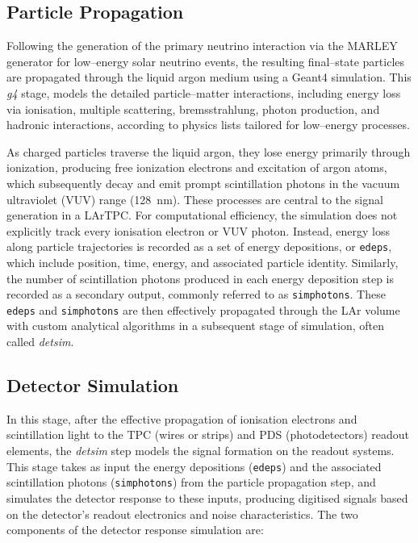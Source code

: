 \subsection{Particle Propagation}
Following the generation of the primary neutrino interaction via the \ac{MARLEY} generator for low--energy solar neutrino events, the resulting final--state particles are propagated through the liquid argon medium using a Geant4 simulation. This \emph{g4} stage, models the detailed particle--matter interactions, including energy loss via ionisation, multiple scattering, bremsstrahlung, photon production, and hadronic interactions, according to physics lists tailored for low--energy processes.

As charged particles traverse the liquid argon, they lose energy primarily through ionization, producing free ionization electrons and excitation of argon atoms, which subsequently decay and emit prompt scintillation photons in the vacuum ultraviolet (VUV) range (\SI{128}{\nano\meter}). These processes are central to the signal generation in a \ac{LArTPC}. For computational efficiency, the simulation does not explicitly track every ionisation electron or VUV photon. Instead, energy loss along particle trajectories is recorded as a set of energy depositions, or \texttt{edeps}, which include position, time, energy, and associated particle identity. Similarly, the number of scintillation photons produced in each energy deposition step is recorded as a secondary output, commonly referred to as \texttt{simphotons}. These \texttt{edeps} and \texttt{simphotons} are then effectively propagated through the \ac{LAr} volume with custom analytical algorithms in a subsequent stage of simulation, often called \emph{detsim}.

\subsection{Detector Simulation}
In this stage, after the effective propagation of ionisation electrons and scintillation light to the TPC (wires or strips) and PDS (photodetectors) readout elements, the \emph{detsim} step models the signal formation on the readout systems. This stage takes as input the energy depositions (\texttt{edeps}) and the associated scintillation photons (\texttt{simphotons}) from the particle propagation step, and simulates the detector response to these inputs, producing digitised signals based on the detector's readout electronics and noise characteristics. The two components of the detector response simulation are:

